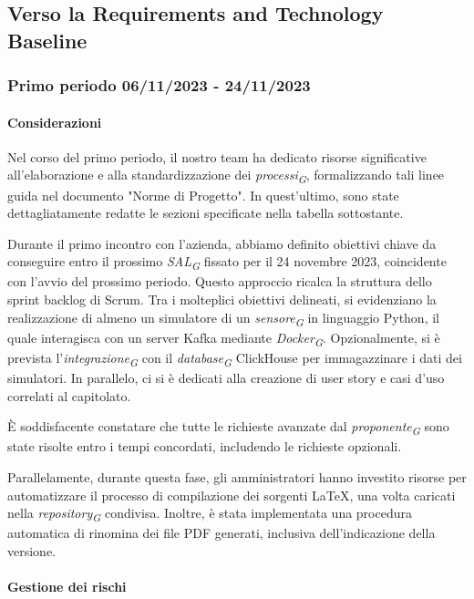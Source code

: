 \subsection{Verso la Requirements and Technology Baseline}
\subsubsection{Primo periodo  06/11/2023 - 24/11/2023}
\paragraph{Considerazioni}
    Nel corso del primo periodo, il nostro team ha dedicato risorse significative all'elaborazione e alla standardizzazione dei \textit{processi}\textsubscript{\textit{G}}, formalizzando tali linee guida nel documento "Norme di Progetto". In quest'ultimo, sono state dettagliatamente redatte le sezioni specificate nella tabella sottostante.

    Durante il primo incontro con l'azienda, abbiamo definito obiettivi chiave da conseguire entro il prossimo \textit{SAL}\textsubscript{\textit{G}} fissato per il 24 novembre 2023, coincidente con l'avvio del prossimo periodo. Questo approccio ricalca la struttura dello sprint backlog di Scrum.
    Tra i molteplici obiettivi delineati, si evidenziano la realizzazione di almeno un simulatore di un \textit{sensore}\textsubscript{\textit{G}} in linguaggio Python, il quale interagisca con un server Kafka mediante \textit{Docker}\textsubscript{\textit{G}}. Opzionalmente, si è prevista l'\textit{integrazione}\textsubscript{\textit{G}} con il \textit{database}\textsubscript{\textit{G}} ClickHouse per immagazzinare i dati dei simulatori. In parallelo, ci si è dedicati alla creazione di user story e casi d'uso correlati al capitolato.

    È soddisfacente constatare che tutte le richieste avanzate dal \textit{proponente}\textsubscript{\textit{G}} sono state risolte entro i tempi concordati, includendo le richieste opzionali.

    Parallelamente, durante questa fase, gli amministratori hanno investito risorse per automatizzare il processo di compilazione dei sorgenti \LaTeX , una volta caricati nella \textit{repository}\textsubscript{\textit{G}} condivisa. Inoltre, è stata implementata una procedura automatica di rinomina dei file PDF generati, inclusiva dell'indicazione della versione.

\paragraph{Gestione dei rischi} 
 
